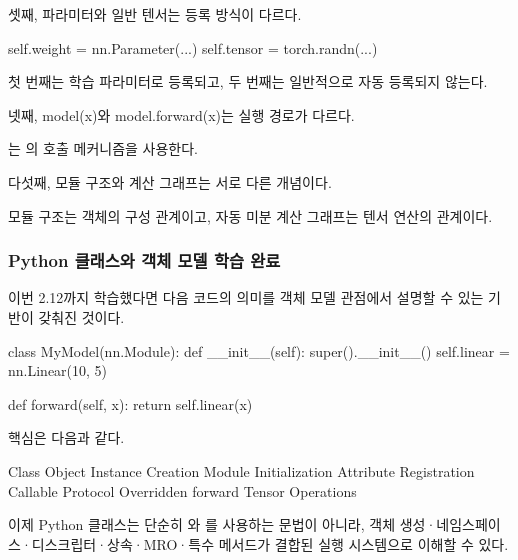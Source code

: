 \begin{dhknote}
\begin{dhksmry}[centered]
셋째, 파라미터와 일반 텐서는 등록 방식이 다르다.
\end{dhksmry}
\end{dhknote}

\begin{dhkcode}
self.weight = nn.Parameter(...)
self.tensor = torch.randn(...)
\end{dhkcode}

첫 번째는 학습 파라미터로 등록되고, 두 번째는 일반적으로 자동 등록되지 않는다.

\begin{dhknote}
\begin{dhksmry}[centered]
넷째, model(x)와 model.forward(x)는 실행 경로가 다르다.
\end{dhksmry}
\end{dhknote}

는 의 호출 메커니즘을 사용한다.

\begin{dhknote}
\begin{dhksmry}[centered]
다섯째, 모듈 구조와 계산 그래프는 서로 다른 개념이다.
\end{dhksmry}
\end{dhknote}

모듈 구조는 객체의 구성 관계이고, 자동 미분 계산 그래프는 텐서 연산의 관계이다.

\subsubsection{Python 클래스와 객체 모델 학습 완료}

이번 2.12까지 학습했다면 다음 코드의 의미를 객체 모델 관점에서 설명할 수 있는 기반이 갖춰진 것이다.

\begin{dhkcode}
class MyModel(nn.Module):
    def __init__(self):
        super().__init__()
        self.linear = nn.Linear(10, 5)

    def forward(self, x):
        return self.linear(x)
\end{dhkcode}

핵심은 다음과 같다.

\begin{dhksmry}[centered]
Class Object
\da
Instance Creation
\da
Module Initialization
\da
Attribute Registration
\da
Callable Protocol
\da
Overridden forward
\da
Tensor Operations
\end{dhksmry}

이제 Python 클래스는 단순히 와 를 사용하는 문법이 아니라, 객체 생성·네임스페이스·디스크립터·상속·MRO·특수 메서드가 결합된 실행 시스템으로 이해할 수 있다.
